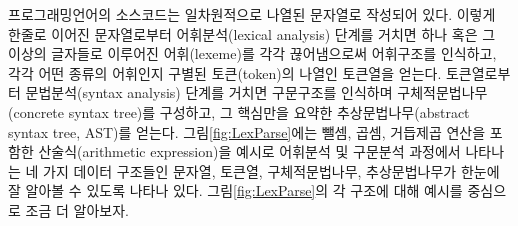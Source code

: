 \documentclass[b5paper,chapter,figtabcapt]{oblivoir}
\begin{document}
프로그래밍언어의 소스코드는 일차원적으로 나열된 문자열로 작성되어 있다.
이렇게 한줄로 이어진 문자열로부터 어휘분석(lexical analysis) 단계를 거치면
하나 혹은 그 이상의 글자들로 이루어진 어휘(lexeme)를 각각 끊어냄으로써
어휘구조를 인식하고, 각각 어떤 종류의 어휘인지 구별된 토큰(token)의
나열인 토큰열을 얻는다. 토큰열로부터 문법분석(syntax analysis) 단계를
거치면 구문구조를 인식하며 구체적문법나무(concrete syntax tree)를 구성하고,
그 핵심만을 요약한 추상문법나무(abstract syntax tree, AST)를 얻는다.
그림\;\ref{fig:LexParse}에는 뺄셈, 곱셈, 거듭제곱 연산을 포함한
산술식(arithmetic expression)을 예시로 어휘분석 및 구문분석 과정에서
나타나는 네 가지 데이터 구조들인 문자열, 토큰열, 구체적문법나무,
추상문법나무가 한눈에 잘 알아볼 수 있도록 나타나 있다.
그림\;\ref{fig:LexParse}의 각 구조에 대해 예시를 중심으로 조금
더 알아보자.
\end{document}
